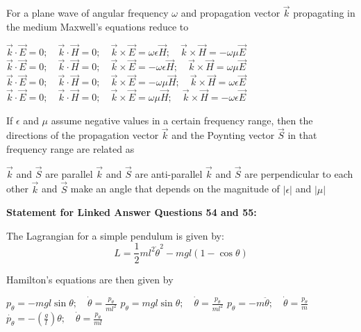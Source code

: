 \documentclass{exam}
\begin{document}
\begin{questions}
\question For a plane wave of angular frequency $\omega$ and propagation vector $\vec{k}$ propagating in the medium Maxwell's equations reduce to\hfill{}

\begin{choices}
	\choice $\vec{k} \cdot \vec{E} = 0; \quad \vec{k} \cdot \vec{H} = 0; \quad \vec{k} \times \vec{E} = \omega\epsilon\vec{H}; \quad \vec{k} \times \vec{H} = -\omega\mu\vec{E}$
	\choice $\vec{k} \cdot \vec{E} = 0; \quad \vec{k} \cdot \vec{H} = 0; \quad \vec{k} \times \vec{E} = -\omega\epsilon\vec{H}; \quad \vec{k} \times \vec{H} = \omega\mu\vec{E}$
	\choice $\vec{k} \cdot \vec{E} = 0; \quad \vec{k} \cdot \vec{H} = 0; \quad \vec{k} \times \vec{E} = -\omega\mu\vec{H}; \quad \vec{k} \times \vec{H} = \omega\epsilon\vec{E}$
	\choice $\vec{k} \cdot \vec{E} = 0; \quad \vec{k} \cdot \vec{H} = 0; \quad \vec{k} \times \vec{E} = \omega\mu\vec{H}; \quad \vec{k} \times \vec{H} = -\omega\epsilon\vec{E}$
\end{choices}

\question If $\epsilon$ and $\mu$ assume negative values in a certain frequency range, then the directions of the propagation vector $\vec{k}$ and the Poynting vector $\vec{S}$ in that frequency range are related as\hfill{}

\begin{choices}
	\choice $\vec{k}$ and $\vec{S}$ are parallel \choice $\vec{k}$ and $\vec{S}$ are anti-parallel
	\choice $\vec{k}$ and $\vec{S}$ are perpendicular to each other
	\choice $\vec{k}$ and $\vec{S}$ make an angle that depends on the magnitude of $|\epsilon|$ and $|\mu|$
\end{choices}

\textbf{Statement for Linked Answer Questions 54 and 55:}
\par\noindent The Lagrangian for a simple pendulum is given by:
\[ L = \frac{1}{2}ml^2\dot{\theta}^2 - mgl(1-\cos\theta) \]

\question Hamilton's equations are then given by\hfill{}

\begin{choices}
	\begin{multicols}{2}
	 \choice $p_{\theta} = -mgl\sin\theta; \quad \dot{\theta} = \frac{p_{\theta}}{ml^2}$
	\choice $p_{\theta} = mgl\sin\theta; \quad \dot{\theta} = \frac{p_{\theta}}{ml^2}$
	\choice $p_{\theta} = -m\ddot{\theta}; \quad \dot{\theta} = \frac{p_{\theta}}{m}$
	\choice $\dot{p_{\theta}} = -\left(\frac{g}{l}\right)\theta; \quad \dot{\theta} = \frac{p_{\theta}}{ml}$
	\end{multicols}
\end{choices}


\end{questions}
\end{document}
